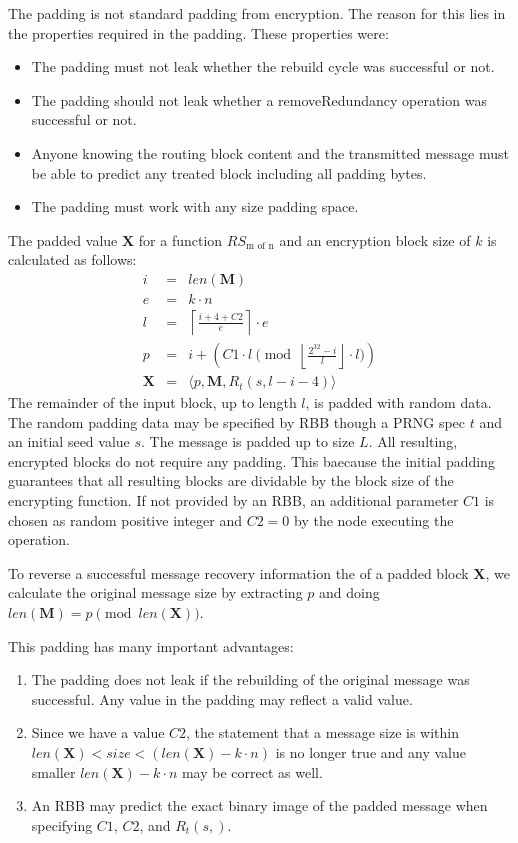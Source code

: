 \documentclass[10pt,journal,compsoc]{IEEEtran}
\begin{document}
The padding is not standard padding from encryption. The reason for this lies in the properties required in the padding. These properties were:
\begin{itemize}
	\item The padding must not leak whether the rebuild cycle was successful or not.
	\item The padding should not leak whether a removeRedundancy operation was successful or not. 
	\item Anyone knowing the routing block content and the transmitted message must be able to predict any treated block including all padding bytes.
	\item The padding must work with any size padding space.
\end{itemize}

The padded value $\mathbf{X}$ for a function $RS_{\text{m of n}}$ and an encryption block size of $k$ is calculated as follows:
\begin{eqnarray}
i          & = & len(\mathbf{M})\\
e          & = & k \cdot n\\
l          & = & \left\lceil\frac{i + 4 + C2 }{e}\right\rceil\cdot e\\
p          & = & i + \left( C1 \cdot l \pmod{\left\lfloor\frac{2^{32}-i}{l}\right\rfloor\cdot l}\right)\\
\mathbf{X} & = & \langle p,\mathbf{M},R_{t}\left(s,l-i-4\right)\rangle
\end{eqnarray}    
The remainder of the input block, up to length $l$, is padded with random data. The random padding data may be specified by RBB though a PRNG spec $t$ and an initial seed value $s$. The message is padded up to size $L$. All resulting, encrypted blocks do not require any padding. This baecause the initial padding guarantees that all resulting blocks are dividable by the block size of the encrypting function. If not provided by an RBB, an additional parameter $C1$ is chosen as random positive integer and $C2=0$  by the node executing the operation.

To reverse a successful message recovery information the of a padded block $\mathbf{X}$, we calculate the original message size by extracting $p$ and doing $len(\mathbf{M})=p \pmod{ len(\mathbf{X})}$.

This padding has many important advantages:
\begin{enumerate}
	\item The padding does not leak if the rebuilding of the original message was successful. Any value in the padding may reflect a valid value.
	\item Since we have a value $C2$, the statement that a message size is within $len(\mathbf{X})<size<(len(\mathbf{X})-k\cdot n)$ is no longer true and any value smaller $len(\mathbf{X})-k\cdot n$ may be correct as well.
	\item An RBB may predict the exact binary image of the padded message when specifying $C1$, $C2$, and $R_{t}(s,)$.
\end{enumerate}
\end{document}
